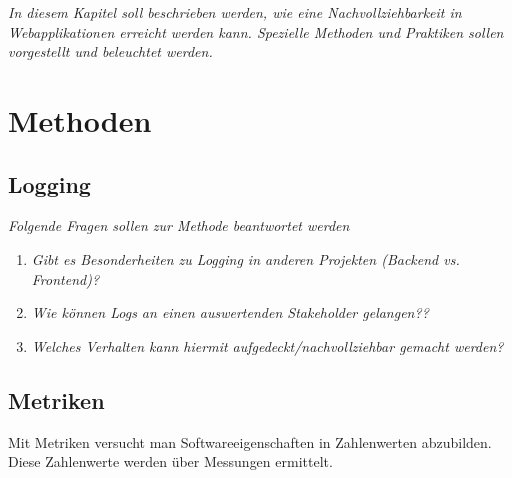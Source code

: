 
\textit{In diesem Kapitel soll beschrieben werden, wie eine Nachvollziehbarkeit in Webapplikationen erreicht werden kann. Spezielle Methoden und Praktiken sollen vorgestellt und beleuchtet werden.}

\section{Methoden}

\subsection{Logging}

\textit{Folgende Fragen sollen zur Methode beantwortet werden}
\begin{enumerate}
	\item \textit{Gibt es Besonderheiten zu Logging in anderen Projekten (Backend vs. Frontend)?}
	\item \textit{Wie können Logs an einen auswertenden Stakeholder gelangen??}
	\item \textit{Welches Verhalten kann hiermit aufgedeckt/nachvollziehbar gemacht werden?}
\end{enumerate}

%

\subsection{Metriken}

Mit Metriken versucht man Softwareeigenschaften in Zahlenwerten abzubilden. Diese Zahlenwerte werden über Messungen ermittelt.

